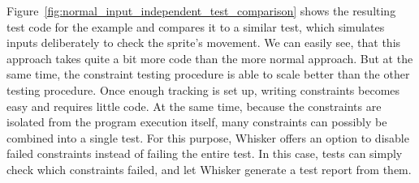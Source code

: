 Figure~\ref{fig:normal_input_independent_test_comparison} shows the resulting test code for the example
and compares it to a similar test, which simulates inputs deliberately to check the sprite's movement.
We can easily see, that this approach takes quite a bit more code than the more normal approach.
But at the same time, the constraint testing procedure is able to scale better than the other testing procedure.
Once enough tracking is set up, writing constraints becomes easy and requires little code.
At the same time, because the constraints are isolated from the program execution itself,
many constraints can possibly be combined into a single test.
For this purpose, Whisker offers an option to disable failed constraints instead of failing the entire test.
In this case, tests can simply check which constraints failed, and let Whisker generate a test report from them.

